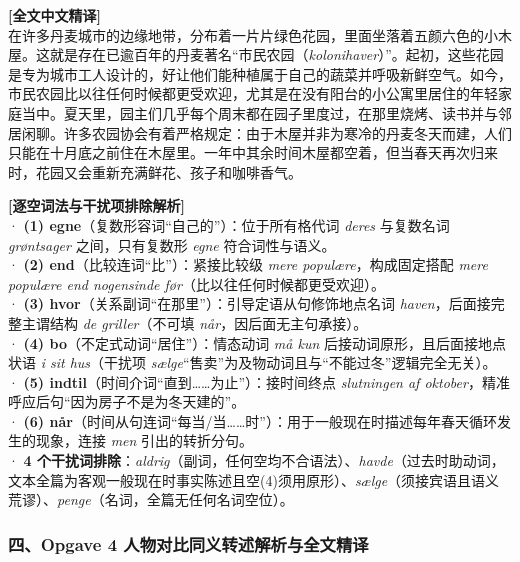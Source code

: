 \begin{transbox}
\small
\textbf{\color{NCDTeal}[全文中文精译]}\\
在许多丹麦城市的边缘地带，分布着一片片绿色花园，里面坐落着五颜六色的小木屋。这就是存在已逾百年的丹麦著名“市民农园（\textit{kolonihaver}）”。起初，这些花园是专为城市工人设计的，好让他们能种植属于自己的蔬菜并呼吸新鲜空气。如今，市民农园比以往任何时候都更受欢迎，尤其是在没有阳台的小公寓里居住的年轻家庭当中。夏天里，园主们几乎每个周末都在园子里度过，在那里烧烤、读书并与邻居闲聊。许多农园协会有着严格规定：由于木屋并非为寒冷的丹麦冬天而建，人们只能在十月底之前住在木屋里。一年中其余时间木屋都空着，但当春天再次归来时，花园又会重新充满鲜花、孩子和咖啡香气。

\vspace{0.35em}
\textbf{\color{NCDNavy}[逐空词法与干扰项排除解析]}\\
· \textbf{(1) egne}（复数形容词“自己的”）：位于所有格代词 \textit{deres} 与复数名词 \textit{grøntsager} 之间，只有复数形 \textit{egne} 符合词性与语义。\\
· \textbf{(2) end}（比较连词“比”）：紧接比较级 \textit{mere populære}，构成固定搭配 \textit{mere populære end nogensinde før}（比以往任何时候都更受欢迎）。\\
· \textbf{(3) hvor}（关系副词“在那里”）：引导定语从句修饰地点名词 \textit{haven}，后面接完整主谓结构 \textit{de griller}（不可填 \textit{når}，因后面无主句承接）。\\
· \textbf{(4) bo}（不定式动词“居住”）：情态动词 \textit{må kun} 后接动词原形，且后面接地点状语 \textit{i sit hus}（干扰项 \textit{sælge}“售卖”为及物动词且与“不能过冬”逻辑完全无关）。\\
· \textbf{(5) indtil}（时间介词“直到……为止”）：接时间终点 \textit{slutningen af oktober}，精准呼应后句“因为房子不是为冬天建的”。\\
· \textbf{(6) når}（时间从句连词“每当/当……时”）：用于一般现在时描述每年春天循环发生的现象，连接 \textit{men} 引出的转折分句。\\
· \textbf{4 个干扰词排除}：\textit{aldrig}（副词，任何空均不合语法）、\textit{havde}（过去时助动词，文本全篇为客观一般现在时事实陈述且空(4)须用原形）、\textit{sælge}（须接宾语且语义荒谬）、\textit{penge}（名词，全篇无任何名词空位）。
\end{transbox}

\subsubsection*{四、Opgave 4 人物对比同义转述解析与全文精译}

